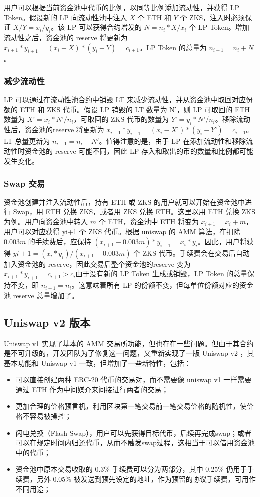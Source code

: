 \documentclass[]{template/llncs}
\begin{document}
用户可以根据当前资金池中代币的比例，以同等比例添加流动性，并获得 LP Token。假设新的 LP 向流动性池中注入 $X$ 个 ETH 和 $Y$ 个 ZKS，注入时必须保证 $X/Y = x_i/y_i$。该 LP 可以获得合约增发的 $N = n_i*X/x_i$ 个 LP Token。增加流动性之后，资金池的 reserve 将更新为 $x_{i+1}*y_{i+1} =  (x_i+X)*(y_i+Y) = c_{i+1}$。LP Token 的总量为 $n_{i+1} = n_i + N$。

\subsubsection{减少流动性}

 LP 可以通过在流动性池合约中销毁 LT 来减少流动性，并从资金池中取回对应份额的 ETH 和 ZKS 代币。假设 LP 销毁的 LT 数量为 N’，则 LP 可取回的 ETH 数量为 $X’ = x_i*N’/n_i$，可取回的 ZKS 代币的数量为 $Y’ = y_i*N’/n_i$。移除流动性后，资金池的reserve 将更新为 $x_{i+1}*y_{i+1} = (x_i - X’)*(y_i - Y’) = c_{i+1}$。LT 总量更新为 $n_{i+1} = n_i - N'$。值得注意的是，由于 LP 在添加流动性和移除流动性时资金池的 reserve 可能不同，因此 LP 存入和取出的币的数量和比例都可能发生变化。

\subsubsection{Swap 交易}

资金池创建并注入流动性后，持有 ETH 或 ZKS 的用户就可以开始在资金池中进行 Swap，用 ETH 兑换 ZKS，或者用 ZKS 兑换 ETH。这里以用 ETH 兑换 ZKS 为例。用户向资金池中转入 $m$ 个 ETH，资金池中 ETH 将变为 $x_{i+1} = x_i + m，$用户可以对应获得 yi+1 个 ZKS 代币。根据 uniswap 的 AMM 算法，在扣除 $0.003m$ 的手续费后，应保持 $(x_{i+1} - 0.003m)*y_{i+1} = x_i*y_i$。因此，用户将获得 $yi+1 = (x_i*y_i)/(x_{i+1} - 0.003m)$ 个 ZKS 代币。手续费会在交易后自动加入资金池的 reserve，因此交易后整个资金池的reserve 变为 $x_{i+1}*y_{i+1} = c_{i+1} > c_i$由于没有新的 LP Token 生成或销毁，LP Token 的总量保持不变，即 $n_{i+1} = n_i$。这意味着所有 LP 的份额不变，但每单位份额对应的资金池 reserve 总量增加了。


\subsection{Uniswap v2 版本}
Uniswap v1 实现了基本的 AMM 交易所功能，但也存在一些问题。但由于其合约是不可升级的，开发团队为了修复这一问题，又重新实现了一版 Uniswap v2 \cite{uniswapv2}，其基本功能和 Uniswap v1 一致，但增加了一些新特性，包括：

\begin{itemize}
	\item 可以直接创建两种 ERC-20 代币的交易对，而不需要像 uniswap v1 一样需要通过 ETH 作为中间媒介来间接进行两者的交易；
	\item 更加合理的价格预言机，利用区块第一笔交易前一笔交易价格的随机性，使价格不容易被操控；
	\item 闪电兑换（Flash Swap），用户可以先获得目标代币，后续再完成swap；或者可以在规定时间内归还代币，从而不触发swap过程，这相当于可以借用资金池中的代币；
	\item 资金池中原本交易收取的 0.3\% 手续费可以分为两部分，其中 0.25\% 仍用于手续费，另外 0.05\% 被发送到预先设定的地址，作为预留的协议手续费，可用作不同用途；
\end{itemize}
\end{document}
